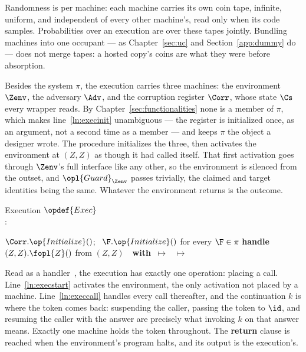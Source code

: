 \documentclass[10pt,oneside,openany]{book}
\theoremstyle{accentdef}
\theoremstyle{accentplain}
\begin{document}
Randomness is per machine: each machine carries its own coin tape, infinite, uniform, and
independent of every other machine's, read only when its code samples. Probabilities over an
execution are over these tapes jointly. Bundling machines into one occupant --- as
Chapter~\ref{sec:uc} and Section~\ref{app:dummy} do --- does not merge tapes: a hosted copy's
coins are what they were before absorption.

Besides the system $\pi$, the execution carries three machines: the environment $\Zenv$, the
adversary $\Adv$, and the corruption register $\Corr$, whose state $\Cs$ every wrapper reads. By
Chapter~\ref{sec:functionalities} none is a member of $\pi$, which makes
line~\ref{ln:execinit} unambiguous --- the register is initialized once, as an argument, not a
second time as a member --- and keeps $\pi$ the object a designer wrote. The procedure initializes
the three, then activates the environment at $(Z,Z)$ as though it had called itself. That first
activation goes through $\Zenv$'s full interface like any other, so the environment is silenced
from the outset, and $\opl{Guard}_{\Zenv}$ passes trivially, the claimed and target identities
being the same. Whatever the environment returns is the outcome.

\begin{procedure}{Execution $\opdef{Exec}$ \\
}
:
\begin{algorithmic}[1]
\State $\Corr.\op{Initialize}()$; \ $\F.\op{Initialize}()$ for every $\F \in \pi$ \label{ln:execinit}
\State \textbf{handle}\ \ $(Z,Z).\fopl{Z}()$ from $(Z,Z)$\ \ \textbf{with} \label{ln:execstart}
\State \quad {}
       $\ \mapsto\ $ 
\State \quad {}
       $\ \mapsto\ $  \label{ln:execcall}
\end{algorithmic}
\end{procedure}

Read as a handler~\cite{PP09,BP15}, the execution has exactly one operation: placing a call.
Line~\ref{ln:execstart} activates the environment, the only activation not placed by a machine.
Line~\ref{ln:execcall} handles every call thereafter, and the continuation $k$ is where the token
comes back: suspending the caller, passing the token to $\id$, and resuming the caller with the
answer are precisely what invoking $k$ on that answer means. Exactly one machine holds the token
throughout. The \textbf{return} clause is reached when the environment's program halts, and its
output is the execution's.
\end{document}
